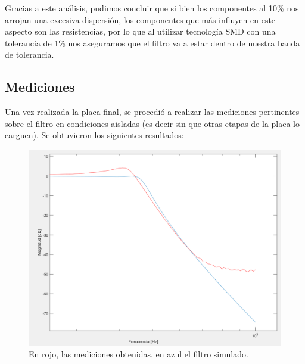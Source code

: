 \documentclass[../../ASSD_TP1_G7.tex]{subfiles}
\begin{document}
Gracias a este análisis, pudimos concluir que si bien los componentes
al 10\% nos arrojan una excesiva dispersión, los componentes que más
influyen en este aspecto son las resistencias, por lo que al utilizar
tecnología SMD con una tolerancia de 1\% nos aseguramos que el filtro
va a estar dentro de nuestra banda de tolerancia.

\subsection{Mediciones}
Una vez realizada la placa final, se procedió a realizar las mediciones pertinentes sobre el filtro en condiciones aisladas (es decir sin que otras etapas de la placa lo carguen). Se obtuvieron los siguientes resultados:

\begin{figure}[H]
\begin{center}
\includegraphics[scale=0.6]{Imagenes/bode.png}
\end{center}
\caption{En rojo, las mediciones obtenidas, en azul el filtro simulado.}
\end{figure}
\end{document}
